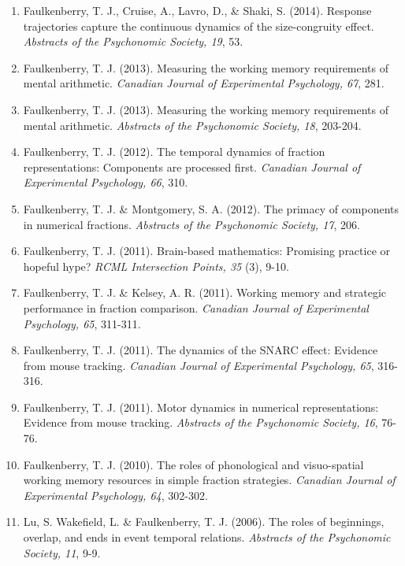 \documentclass[article,10pt]{article}
\begin{document}
\begin{enumerate}
\item Faulkenberry, T. J., Cruise, A., Lavro, D., \& Shaki, S. (2014). Response trajectories capture the continuous dynamics of the size-congruity effect. \emph{Abstracts of the Psychonomic Society, 19}, 53.
\item Faulkenberry, T. J. (2013). Measuring the working memory requirements of mental arithmetic. \emph{Canadian Journal of Experimental Psychology, 67}, 281.
\item Faulkenberry, T. J. (2013). Measuring the working memory requirements of mental arithmetic. \emph{Abstracts of the Psychonomic Society, 18}, 203-204.
\item Faulkenberry, T. J. (2012). The temporal dynamics of fraction representations: Components are processed first. \emph{Canadian Journal of Experimental Psychology, 66}, 310.
\item Faulkenberry, T. J. \& Montgomery, S. A. (2012). The primacy of components in numerical fractions. \emph{Abstracts of the Psychonomic Society, 17}, 206.
\item Faulkenberry, T. J. (2011). Brain-based mathematics: Promising practice or hopeful hype? \emph{RCML Intersection Points, 35} (3), 9-10.
\item Faulkenberry, T. J. \& Kelsey, A. R. (2011). Working memory and strategic performance in fraction comparison. \emph{Canadian Journal of Experimental Psychology, 65}, 311-311.
\item Faulkenberry, T. J. (2011). The dynamics of the SNARC effect: Evidence from mouse tracking. \emph{Canadian Journal of Experimental Psychology, 65}, 316-316.
\item Faulkenberry, T. J. (2011). Motor dynamics in numerical representations: Evidence from mouse tracking. \emph{Abstracts of the Psychonomic Society, 16}, 76-76.
\item Faulkenberry, T. J. (2010). The roles of phonological and visuo-spatial working memory resources in simple fraction strategies. \emph{Canadian Journal of Experimental Psychology, 64}, 302-302.
\item Lu, S. Wakefield, L. \& Faulkenberry, T. J. (2006). The roles of beginnings, overlap, and ends in event temporal relations. \emph{Abstracts of the Psychonomic Society, 11}, 9-9.
\end{enumerate}
\end{document}
